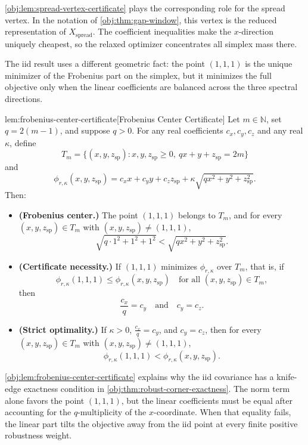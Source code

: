 \cref{obj:lem:spread-vertex-certificate} plays the corresponding role for the spread vertex. In the notation of \cref{obj:thm:gap-window}, this vertex is the reduced representation of \(X_{\mathrm{spread}}\). The coefficient inequalities make the \(x\)-direction uniquely cheapest, so the relaxed optimizer concentrates all simplex mass there.

The iid result uses a different geometric fact: the point \((1,1,1)\) is the unique minimizer of the Frobenius part on the simplex, but it minimizes the full objective only when the linear coefficients are balanced across the three spectral directions.

\begin{lemmav}{lem:frobenius-center-certificate}[Frobenius Center Certificate]
Let \(m\in\mathbb N\), set \(q=2(m-1)\), and suppose \(q>0\).  For any real coefficients \(c_x,c_y,c_z\) and any real \(\kappa\), define
\[
T_m=\{(x,y,z_{\mathrm{sp}}): x,y,z_{\mathrm{sp}}\ge 0,\ qx+y+z_{\mathrm{sp}}=2m\}
\]
and
\[
\phi_{r,\kappa}(x,y,z_{\mathrm{sp}})
=
c_xx+c_yy+c_zz_{\mathrm{sp}}
+\kappa\sqrt{q x^2+y^2+z_{\mathrm{sp}}^2}.
\]
Then:
\begin{itemize}
\item \textbf{(Frobenius center.)} The point \((1,1,1)\) belongs to \(T_m\), and for every \((x,y,z_{\mathrm{sp}})\in T_m\) with \((x,y,z_{\mathrm{sp}})\ne(1,1,1)\),
\[
\sqrt{q\cdot 1^2+1^2+1^2}
<
\sqrt{q x^2+y^2+z_{\mathrm{sp}}^2}.
\]
\item \textbf{(Certificate necessity.)} If \((1,1,1)\) minimizes \(\phi_{r,\kappa}\) over \(T_m\), that is, if
\[
\phi_{r,\kappa}(1,1,1)\le
\phi_{r,\kappa}(x,y,z_{\mathrm{sp}})
\quad\text{for all }(x,y,z_{\mathrm{sp}})\in T_m,
\]
then
\[
\frac{c_x}{q}=c_y
\quad\text{and}\quad
c_y=c_z.
\]
\item \textbf{(Strict optimality.)} If \(\kappa>0\), \(\frac{c_x}{q}=c_y\), and \(c_y=c_z\), then for every \((x,y,z_{\mathrm{sp}})\in T_m\) with \((x,y,z_{\mathrm{sp}})\ne(1,1,1)\),
\[
\phi_{r,\kappa}(1,1,1)
<
\phi_{r,\kappa}(x,y,z_{\mathrm{sp}}).
\]
\end{itemize}
\end{lemmav}

\cref{obj:lem:frobenius-center-certificate} explains why the iid covariance has a knife-edge exactness condition in \cref{obj:thm:robust-corner-exactness}. The norm term alone favors the point \((1,1,1)\), but the linear coefficients must be equal after accounting for the \(q\)-multiplicity of the \(x\)-coordinate. When that equality fails, the linear part tilts the objective away from the iid point at every finite positive robustness weight.

